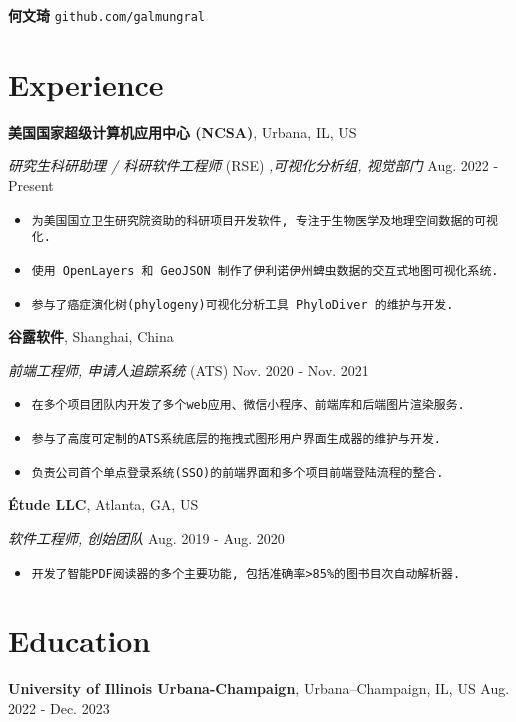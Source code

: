 \documentclass[11pt]{article}
\begin{document}
{\Huge\textbf{何文琦}} \quad \texttt{github.com/galmungral}

\section*{Experience}

\textbf{美国国家超级计算机应用中心 (NCSA)}, Urbana, IL, US

\textit{研究生科研助理 / 科研软件工程师} (RSE) \textit{,可视化分析组, 视觉部门} \hfill Aug. 2022 - Present

\begin{itemize}
\item \texttt{为美国国立卫生研究院资助的科研项目开发软件, 专注于生物医学及地理空间数据的可视化.}
\item \texttt{使用 OpenLayers 和 GeoJSON 制作了伊利诺伊州蜱虫数据的交互式地图可视化系统.}
\item \texttt{参与了癌症演化树(phylogeny)可视化分析工具 PhyloDiver 的维护与开发.}
\end{itemize}

\textbf{谷露软件}, Shanghai, China

\textit{前端工程师, 申请人追踪系统} (ATS) \hfill Nov. 2020 - Nov. 2021

\begin{itemize}
\item \texttt{在多个项目团队内开发了多个web应用、微信小程序、前端库和后端图片渲染服务.}
\item \texttt{参与了高度可定制的ATS系统底层的拖拽式图形用户界面生成器的维护与开发.}
\item \texttt{负责公司首个单点登录系统(SSO)的前端界面和多个项目前端登陆流程的整合.}
\end{itemize}

\textbf{Étude LLC}, Atlanta, GA, US

\textit{软件工程师, 创始团队} \hfill Aug. 2019 - Aug. 2020

\begin{itemize}
\item \texttt{开发了智能PDF阅读器的多个主要功能, 包括准确率>85\%的图书目次自动解析器.}
\end{itemize}

\section*{Education}

\textbf{University of Illinois Urbana-Champaign}, Urbana–Champaign, IL, US \hfill Aug. 2022 - Dec. 2023
\end{document}
